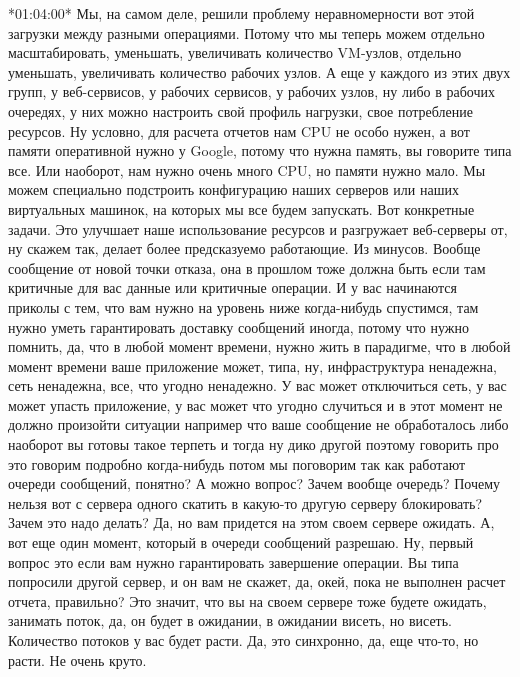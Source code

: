 \documentclass[12pt]{article} %
\begin{document}
*01:04:00*
Мы, на самом деле, решили проблему неравномерности вот этой загрузки между разными операциями. Потому что мы теперь можем отдельно масштабировать, уменьшать, увеличивать количество VM-узлов, отдельно уменьшать, увеличивать количество рабочих узлов. А еще у каждого из этих двух групп, у веб-сервисов, у рабочих сервисов, у рабочих узлов, ну либо в рабочих очередях, у них можно настроить свой профиль нагрузки, свое потребление ресурсов. Ну условно, для расчета отчетов нам  CPU не особо нужен, а вот памяти оперативной нужно у Google, потому что нужна память, вы говорите типа все. Или наоборот, нам нужно очень много CPU, но памяти нужно мало. Мы можем специально подстроить конфигурацию наших серверов или наших виртуальных машинок, на которых мы все будем запускать. Вот конкретные задачи. Это улучшает наше использование ресурсов и разгружает веб-серверы от, ну скажем так, делает более предсказуемо работающие. Из минусов.  Вообще сообщение от новой точки отказа, она в прошлом тоже должна быть если там критичные для вас данные или критичные операции.  И у вас начинаются приколы с тем, что вам нужно на уровень ниже когда-нибудь спустимся, там нужно уметь гарантировать доставку сообщений иногда, потому что нужно помнить, да, что в любой момент времени, нужно жить в парадигме, что в любой момент времени ваше приложение может, типа, ну, инфраструктура ненадежна, сеть ненадежна, все, что угодно ненадежно.  У вас может отключиться сеть, у вас может упасть приложение, у вас может что угодно случиться и в этот момент не должно произойти ситуации например что ваше сообщение не обработалось либо наоборот вы готовы такое терпеть и тогда ну дико другой поэтому говорить про это говорим подробно когда-нибудь потом мы поговорим так как работают очереди сообщений, понятно?  А можно вопрос?  Зачем вообще очередь?  Почему нельзя вот с сервера одного скатить в какую-то другую серверу блокировать?  Зачем это надо делать?  Да, но вам придется на этом своем сервере ожидать.  А, вот еще один момент, который в очереди сообщений разрешаю.  Ну, первый вопрос это если вам нужно гарантировать завершение операции. Вы типа попросили другой сервер, и он вам не скажет, да, окей, пока не выполнен расчет отчета, правильно? Это значит, что вы на своем сервере тоже будете ожидать, занимать поток, да, он будет в ожидании, в ожидании висеть, но висеть.  Количество потоков у вас будет расти. Да, это синхронно, да, еще что-то, но расти. Не очень круто.
\end{document}
